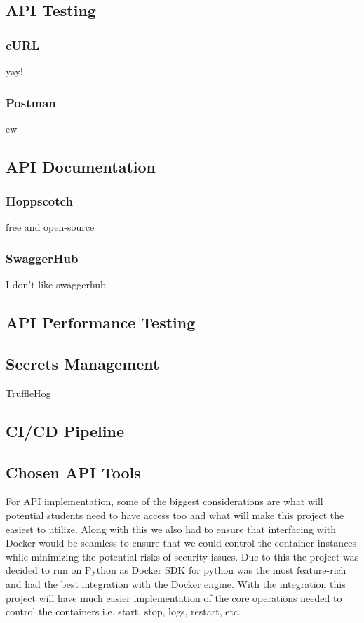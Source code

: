 \documentclass[12pt]{article}
\begin{document}
\subsection{API Testing}

\subsubsection{cURL}
yay!

\subsubsection{Postman}
ew

\subsection{API Documentation}

\subsubsection{Hoppscotch}
free and open-source

\subsubsection{SwaggerHub}
I don't like swaggerhub

\subsection{API Performance Testing}

\subsection{Secrets Management}
TruffleHog

\subsection{CI/CD Pipeline}

\subsection{Chosen API Tools}
For API implementation, some of the biggest considerations are what will potential students need to have access too and what will make this project the easiest to utilize. Along with this we also had to ensure that interfacing with Docker would be seamless to ensure that we could control the container instances while minimizing the potential risks of security issues. Due to this the project was decided to run on Python as Docker SDK for python was the most feature-rich and had the best integration with the Docker engine. With the integration this project will have much easier implementation of the core operations needed to control the containers i.e. start, stop, logs, restart, etc.
\end{document}
